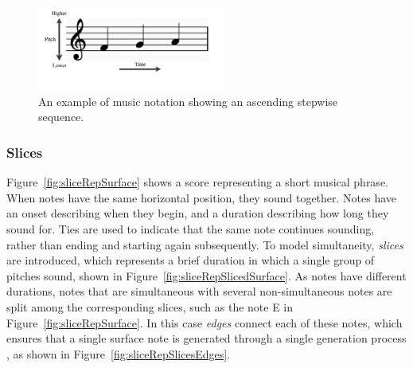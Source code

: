 \documentclass[12pt,a4paper,twoside,openany]{report} \usepackage[pdfborder={0 0 0}]{hyperref}    %
\theoremstyle{definition} \newtheorem{definition}{Definition}[section]
\begin{document}
\begin{figure}[h] 
\centering \includegraphics[width=0.55\textwidth]{prep/pitchTime.png}
\captionsetup{width=.7\linewidth} \caption{An example of music notation showing an ascending stepwise sequence.}
\label{fig:pitchTime} 
\end{figure} 

\subsubsection{Slices}
\label{sub:slices}

Figure~\ref{fig:sliceRepSurface} shows a score representing a short musical phrase. When notes have the same horizontal position, they sound together.
Notes have an onset describing when they begin, and a duration describing how long they sound for. Ties are used to
indicate that the same note continues sounding, rather than ending and starting again subsequently. To model
simultaneity, \textit{slices} are introduced, which represents a brief duration in which a single group of pitches
sound, shown in Figure~\ref{fig:sliceRepSlicedSurface}. As notes have different durations, notes that are simultaneous with several non-simultaneous notes are split
among the corresponding slices, such as the note E in Figure~\ref{fig:sliceRepSurface}. In this case \textit{edges}
connect each of these notes, which ensures that a single surface note is generated through a single generation process
\cite{finkensiepModelingInferringProtovoice2021}, as shown in Figure~\ref{fig:sliceRepSlicesEdges}. 
\end{document}
